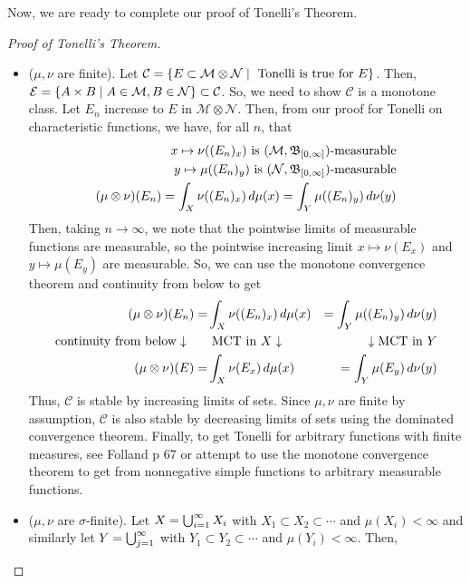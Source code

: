\documentclass[11pt,leqno,oneside]{amsbook}
\numberwithin{thm}{section}
\newcommand{\M}{\mathcal{M}} %
\newcommand{\Ep}{\mathcal{E}} %
\newcommand{\cN}{\mathcal{N}}
\newcommand{\cC}{\mathcal{C}} %
\newcommand{\s}{$\sigma$-} %
\newcommand{\ox}{\otimes}
\begin{document}
Now, we are ready to complete our proof of Tonelli's Theorem.
\begin{proof}[Proof of Tonelli's Theorem]
  \begin{itemize}
  \item (\(\mu, \nu\) are finite). Let \(\cC = \{E \subset \M \ox \cN
    \st \text{ Tonelli is true for }E\}\). Then, \(\Ep = \{A \times B
    \st A \in \M, B \in \cN\} \subset \cC\). So, we need to show
    \(\cC\) is a monotone class. Let \(E_n\) increase to \(E\) in \(\M
    \ox \cN\). Then, from our proof for Tonelli on characteristic
    functions, we have, for all \(n\), that
    \begin{align*}
      x \mapsto \nu((E_n)_x) \text{ is
      }(\M,\B_{[0,\infty]})\text{-measurable} \\
      y \mapsto \mu((E_n)_y) \text{ is
      }(\cN,\B_{[0,\infty]})\text{-measurable} \\
      (\mu \ox \nu)(E_n) = \int_X \nu((E_n)_x) \d\mu(x) = \int_Y
      \mu((E_n)_y) \d\nu(y)
    \end{align*}
    Then, taking \(n \to \infty\), we note that the pointwise limits of
    measurable functions are measurable, so the pointwise increasing
    limit \(x \mapsto \nu(E_x)\) and \(y \mapsto \mu(E_y)\) are
    measurable. So, we can use the
    monotone convergence theorem and continuity from below to get
    \begin{align*}
      (\mu \ox \nu)(E_n)
       = &\int_X \nu((E_n)_x) \d\mu(x)
      & = \int_Y \mu((E_n)_y) \d\nu(y) \\
      \text{continuity from below} \downarrow \ \ \ \ \
      & \text{ MCT in }X \downarrow
      & \downarrow\text{MCT in }Y\\
      (\mu \ox \nu)(E) =
      & \int_X \nu(E_x) \d\mu(x)
      & = \int_Y \mu(E_y) \d\nu(y)
    \end{align*}
    Thus, \(\cC\) is stable by increasing limits of sets. Since
    \(\mu,\nu\) are finite by assumption, \(\cC\) is also stable by
    decreasing limits of sets using the dominated convergence
    theorem.   Finally, to get Tonelli for arbitrary functions with
    finite measures, see Folland p 67 or
  attempt to use the monotone convergence theorem to get from
  nonnegative simple functions to arbitrary measurable functions.
  \item (\(\mu,\nu\) are \s finite). Let \(X = \bigcup_{i=1}^\infty
    X_i\) with \(X_1 \subset X_2 \subset \cdots\) and \(\mu(X_i) <
    \infty\) and similarly let \(Y = \bigcup_{j=1}^\infty\) with \(Y_1
    \subset Y_2 \subset \cdots\) and \(\mu(Y_i) < \infty\). Then,

\end{itemize}
\end{proof}
\end{document}
